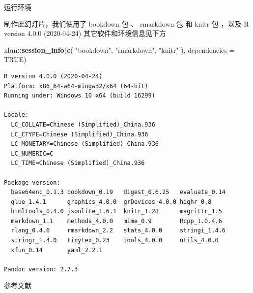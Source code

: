 \documentclass[
  ignorenonframetext,
  UTF8,fontset=adobe,zihao=false]{ctexbeamer}
\newif\ifbibliography
\newenvironment{Shaded}{\begin{snugshade}}{\end{snugshade}}
\newcommand{\DataTypeTok}[1]{\textcolor[rgb]{0.13,0.29,0.53}{#1}}
\newcommand{\KeywordTok}[1]{\textcolor[rgb]{0.13,0.29,0.53}{\textbf{#1}}}
\newcommand{\NormalTok}[1]{#1}
\newcommand{\OperatorTok}[1]{\textcolor[rgb]{0.81,0.36,0.00}{\textbf{#1}}}
\newcommand{\OtherTok}[1]{\textcolor[rgb]{0.56,0.35,0.01}{#1}}
\newcommand{\StringTok}[1]{\textcolor[rgb]{0.31,0.60,0.02}{#1}}
\begin{document}
\begin{frame}{运行环境}
\protect\hypertarget{session-info}{}

制作此幻灯片，我们使用了 bookdown 包 \citep{bookdown2016}、 rmarkdown 包 \citep{rmarkdown2018} 和 knitr 包 \citep{knitr2015}，以及 R version 4.0.0 (2020-04-24) 其它软件和环境信息见下方

\begin{Shaded}
\begin{Highlighting}[]
\NormalTok{xfun}\OperatorTok{::}\KeywordTok{session_info}\NormalTok{(}\KeywordTok{c}\NormalTok{(}
  \StringTok{"bookdown"}\NormalTok{, }\StringTok{"rmarkdown"}\NormalTok{, }\StringTok{"knitr"}
\NormalTok{), }\DataTypeTok{dependencies =} \OtherTok{TRUE}\NormalTok{)}
\end{Highlighting}
\end{Shaded}

\begin{verbatim}
R version 4.0.0 (2020-04-24)
Platform: x86_64-w64-mingw32/x64 (64-bit)
Running under: Windows 10 x64 (build 16299)

Locale:
  LC_COLLATE=Chinese (Simplified)_China.936 
  LC_CTYPE=Chinese (Simplified)_China.936   
  LC_MONETARY=Chinese (Simplified)_China.936
  LC_NUMERIC=C                              
  LC_TIME=Chinese (Simplified)_China.936    

Package version:
  base64enc_0.1.3 bookdown_0.19   digest_0.6.25   evaluate_0.14  
  glue_1.4.1      graphics_4.0.0  grDevices_4.0.0 highr_0.8      
  htmltools_0.4.0 jsonlite_1.6.1  knitr_1.28      magrittr_1.5   
  markdown_1.1    methods_4.0.0   mime_0.9        Rcpp_1.0.4.6   
  rlang_0.4.6     rmarkdown_2.2   stats_4.0.0     stringi_1.4.6  
  stringr_1.4.0   tinytex_0.23    tools_4.0.0     utils_4.0.0    
  xfun_0.14       yaml_2.2.1     

Pandoc version: 2.7.3
\end{verbatim}

\end{frame}

\renewcommand\refname{参考文献}
\begin{frame}[allowframebreaks]{参考文献}
  \bibliographytrue
  
\end{frame}
\end{document}
